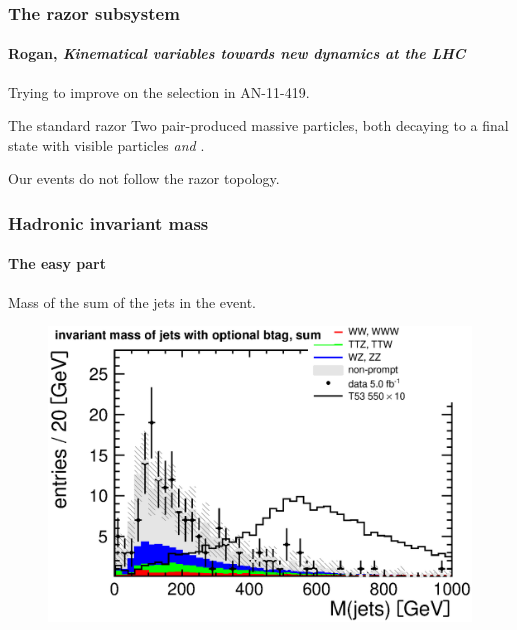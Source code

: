\documentclass[ukenglish]{beamer}
\begin{document}
\begin{frame}
    \frametitle{The razor subsystem}
    \framesubtitle{Rogan, \emph{Kinematical variables towards new dynamics
    at the LHC}}
    Trying to improve on the selection in AN-11-419.
    \begin{block}{The standard razor}
        Two pair-produced massive particles, both decaying to a final state with
        visible particles \emph{and} \met.
    \end{block}
    \alert{Our events do not follow the razor topology.}

\end{frame}

\begin{frame}
    \frametitle{Hadronic invariant mass}
    \framesubtitle{The easy part}
    \begin{block}{}
        Mass of the sum of the jets in the event.
    \end{block}
        \begin{figure}[h]
            \centering
            \includegraphics[width=.7\textwidth]{had_mass_optional_btag_sum.eps}
        \end{figure}
\end{frame}
\end{document}
